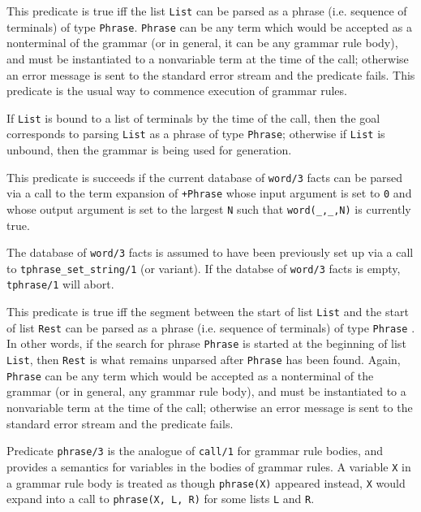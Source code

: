 \begin{description}

    This predicate is true iff the list {\tt List} can be parsed as a phrase 
    (i.e. sequence of terminals) of type {\tt Phrase}.  {\tt Phrase} can be 
    any term which would
    be accepted as a nonterminal of the grammar (or in general, it can 
    be any  grammar rule body), and must be instantiated to a
    nonvariable term  at the time of the call; otherwise an error
    message is sent to the standard error stream and the predicate fails. 
    This predicate is the usual way to commence execution of grammar rules.

    If {\tt List} is bound to a list of terminals by the time of the call,
    then the goal corresponds to parsing {\tt List} as a phrase of type
    {\tt Phrase}; otherwise if {\tt List} is unbound, then the grammar
    is being used for generation.

 This predicate is
    succeeds if the current database of {\tt word/3} facts can be
    parsed via a call to the term expansion of {\tt +Phrase} whose
    input argument is set to {\tt 0} and whose output argument is set
    to the largest {\tt N} such that {\tt word(\_,\_,N)} is currently
    true.  

    The database of {\tt word/3} facts is assumed to have been
    previously set up via a call to {\tt tphrase\_set\_string/1} (or variant).  If
    the databse of {\tt word/3} facts is empty, {\tt tphrase/1} will
    abort.


    This predicate is true iff the segment between the start of list 
    {\tt List} and the start of list {\tt Rest} can be parsed as a phrase 
    (i.e. sequence of terminals) of type {\tt Phrase} . In other words, if 
    the search for phrase 
    {\tt Phrase} is started at the beginning of list {\tt List}, then 
    {\tt Rest} is what remains unparsed after {\tt Phrase} has been
    found. Again, {\tt Phrase} can be any term which
    would be accepted as a nonterminal of the grammar (or in general, any
    grammar rule body), and must be instantiated to a nonvariable term
    at the time of the call; otherwise an error message is sent to the
    standard error stream and the predicate fails.

    Predicate {\tt phrase/3} is the analogue of {\tt call/1} for grammar
    rule bodies, and provides a semantics for variables in the bodies of
    grammar rules.  A variable {\tt X} in a grammar rule body is treated
    as though {\tt phrase(X)} appeared instead, {\tt X} would expand into 
    a call to {\tt phrase(X, L, R)} for some lists {\tt L} and {\tt R}.  


\end{description}
